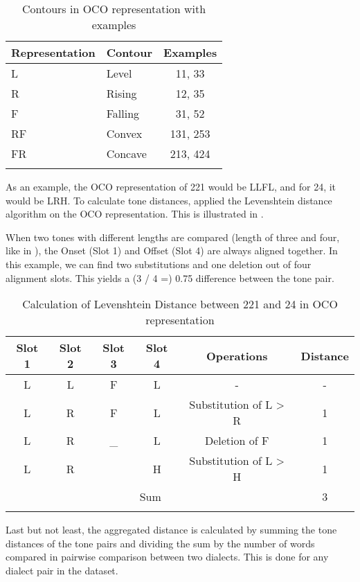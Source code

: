 \documentclass[output=paper, chinesefont]{langscibook}
\begin{document}
\begin{table}
\begin{tabular}{llc}
\lsptoprule
{Representation} & {Contour} & {Examples}\\\midrule
L & Level & 11, 33\\
R & Rising & 12, 35\\
F & Falling & 31, 52\\
RF & Convex & 131, 253\\
FR & Concave & 213, 424\\
\lspbottomrule
\end{tabular}
\caption{Contours in OCO representation with examples}
\label{tab:sung:1}
\end{table}

As an example, the OCO representation of 221 would be LLFL, and for 24, it would be LRH. To calculate tone distances, \citet{YangCastro2008} applied the Levenshtein distance algorithm on the OCO representation. This is illustrated in . 

When two tones with different lengths are compared (length of three and four, like in ), the Onset (Slot 1) and Offset (Slot 4) are always aligned together. In this example, we can find two substitutions and one deletion out of four alignment slots. This yields a (3 / 4 =) 0.75 difference between the tone pair.


\begin{table}
\begin{tabular}{cccccc}
\lsptoprule
{Slot 1} & {Slot 2} & {Slot 3} & {Slot 4} & {Operations} & {Distance}\\\midrule
 L & L & F & L & {}- & {}-\\
 L & R & F & L & Substitution of L > R & 1\\
 L & R & \_ & L & Deletion of F & 1\\
 L & R &  & H & Substitution of L > H & 1\\
\multicolumn{5}{c}{\raggedleft Sum} & 3\\
\lspbottomrule
\end{tabular}
\caption{Calculation of Levenshtein Distance between 221 and 24 in OCO representation}
\label{tab:sung:2}
\end{table}

Last but not least, the aggregated distance is calculated by summing the tone distances of the tone pairs and dividing the sum by the number of words compared in pairwise comparison between two dialects. This is done for any dialect pair in the dataset.
\end{document}
